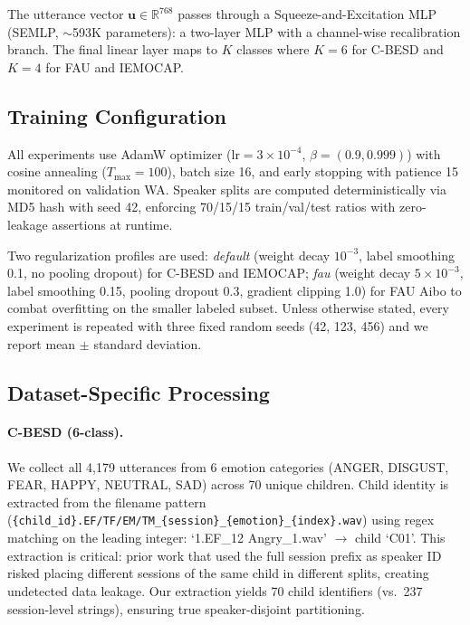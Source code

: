 The utterance vector $\mathbf{u} \in \mathbb{R}^{768}$ passes through a
Squeeze-and-Excitation MLP (SEMLP, $\sim$593K parameters): a two-layer MLP
with a channel-wise recalibration branch. The final linear layer maps to $K$
classes where $K=6$ for C-BESD and $K=4$ for FAU and IEMOCAP.

\subsection{Training Configuration}
\label{ssec:training}

All experiments use AdamW optimizer ($\text{lr}=3\times 10^{-4}$,
$\beta=(0.9,0.999)$) with cosine annealing ($T_{\text{max}}=100$), batch size
16, and early stopping with patience 15 monitored on validation WA. Speaker
splits are computed deterministically via MD5 hash with seed 42, enforcing
70/15/15 train/val/test ratios with zero-leakage assertions at runtime.

Two regularization profiles are used: \textit{default} (weight decay
$10^{-3}$, label smoothing 0.1, no pooling dropout) for C-BESD and IEMOCAP;
\textit{fau} (weight decay $5\times 10^{-3}$, label smoothing 0.15, pooling
dropout 0.3, gradient clipping 1.0) for FAU Aibo to combat overfitting on the
smaller labeled subset. Unless otherwise stated, every experiment is repeated
with three fixed random seeds (42, 123, 456) and we report mean $\pm$ standard
deviation.

\subsection{Dataset-Specific Processing}
\label{ssec:datasets}

\paragraph{C-BESD (6-class).} We collect all 4,179 utterances from 6 emotion
categories (ANGER, DISGUST, FEAR, HAPPY, NEUTRAL, SAD) across 70 unique
children. Child identity is extracted from the filename pattern
(\texttt{\{child\_id\}.EF/TF/EM/TM\_\{session\}\_\{emotion\}\_\{index\}.wav})
using regex matching on the leading integer: `1.EF\_12 Angry\_1.wav'
$\rightarrow$ child `C01'. This extraction is critical: prior work that used
the full session prefix as speaker ID risked placing different sessions of the
same child in different splits, creating undetected data leakage. Our
extraction yields 70 child identifiers (vs.\ 237 session-level strings),
ensuring true speaker-disjoint partitioning.

